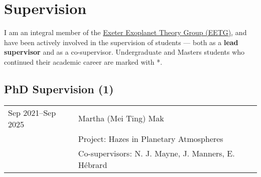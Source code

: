 \documentclass[a4paper, 11pt]{article}
\newcommand{\highlightbold}[1]{\textbf{\textcolor{exeter_bright_green}{#1}}}
\begin{document}
\section{Supervision}
I am an integral member of the \href{https://exoclimatology.com}{Exeter Exoplanet Theory Group (EETG)}, and have been actively involved in the supervision of students --- both as a \highlightbold{lead supervisor} and as a co-supervisor. Undergraduate and Masters students who continued their academic career are marked with *.
\\
\subsection*{PhD Supervision (1)}
\begin{tabularx}{\linewidth}{@{}l X@{}}
Sep 2021--Sep 2025 & Martha (Mei Ting) Mak \\
                  & Project: Hazes in Planetary Atmospheres \\
                  & Co-supervisors: N. J. Mayne, J. Manners, E. Hébrard \\
\end{tabularx}
\end{document}
